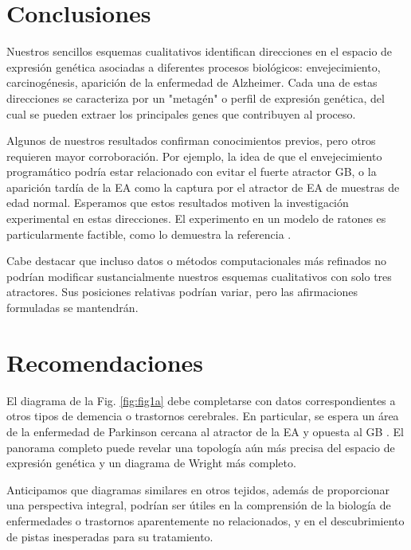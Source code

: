 \chapter*{Conclusiones}\label{conclutions}
\onehalfspacing

Nuestros sencillos esquemas cualitativos identifican direcciones en el espacio de expresión genética asociadas a diferentes procesos biológicos: envejecimiento, carcinogénesis, aparición de la enfermedad de Alzheimer. Cada una de estas direcciones se caracteriza por un "metagén" o perfil de expresión genética, del cual se pueden extraer los principales genes que contribuyen al proceso.

Algunos de nuestros resultados confirman conocimientos previos, pero otros requieren mayor corroboración. Por ejemplo, la idea de que el envejecimiento programático podría estar relacionado con evitar el fuerte atractor GB, o la aparición tardía de la EA como la captura por el atractor de EA de muestras de edad normal. Esperamos que estos resultados motiven la investigación experimental en estas direcciones. El experimento en un modelo de ratones es particularmente factible, como lo demuestra la referencia \cite{hahn2023atlas}.

Cabe destacar que incluso datos o métodos computacionales más refinados no podrían modificar sustancialmente nuestros esquemas cualitativos con solo tres atractores. Sus posiciones relativas podrían variar, pero las afirmaciones formuladas se mantendrán.


\chapter*{Recomendaciones}\label{recomendations}

El diagrama de la Fig. \ref{fig:fig1a} debe completarse con datos correspondientes a otros tipos de demencia o trastornos cerebrales. En particular, se espera un área de la enfermedad de Parkinson cercana al atractor de la EA y opuesta al GB \cite{Mencke_2020}. El panorama completo puede revelar una topología aún más precisa del espacio de expresión genética y un diagrama de Wright más completo.

Anticipamos que diagramas similares en otros tejidos, además de proporcionar una perspectiva integral, podrían ser útiles en la comprensión de la biología de enfermedades o trastornos aparentemente no relacionados, y en el descubrimiento de pistas inesperadas para su tratamiento.

